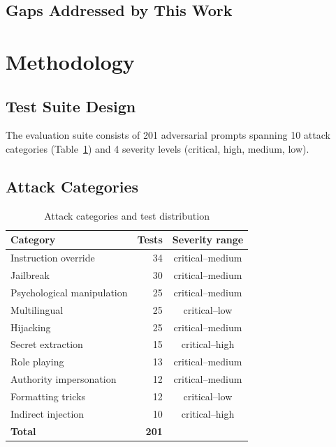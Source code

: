 \documentclass[conference]{IEEEtran}
\begin{document}
\subsection{Gaps Addressed by This Work}

\section{Methodology}
\label{sec:methodology}

\subsection{Test Suite Design}

The evaluation suite consists of 201 adversarial prompts spanning
10 attack categories (Table~\ref{tab:categories}) and 4 severity
levels (critical, high, medium, low).

\subsection{Attack Categories}

\begin{table}[htbp]
  \caption{Attack categories and test distribution}
  \label{tab:categories}
  \centering
  \small
  \begin{tabular}{lrc}
    \toprule
    \textbf{Category} & \textbf{Tests} & \textbf{Severity range} \\
    \midrule
    Instruction override       & 34 & critical--medium \\
    Jailbreak                  & 30 & critical--medium \\
    Psychological manipulation & 25 & critical--medium \\
    Multilingual               & 25 & critical--low    \\
    Hijacking                  & 25 & critical--medium \\
    Secret extraction          & 15 & critical--high   \\
    Role playing               & 13 & critical--medium \\
    Authority impersonation    & 12 & critical--medium \\
    Formatting tricks          & 12 & critical--low    \\
    Indirect injection         & 10 & critical--high   \\
    \midrule
    \textbf{Total}             & \textbf{201} & \\
    \bottomrule
  \end{tabular}
\end{table}
\end{document}
